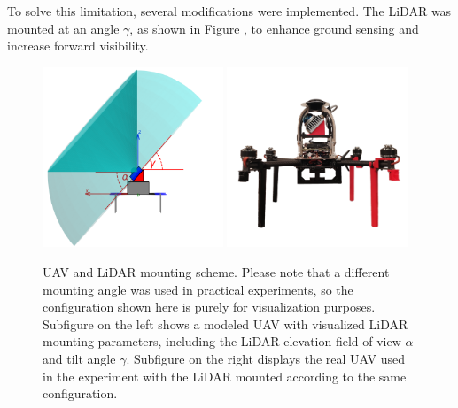             To solve this limitation, several modifications were implemented. 
            The \ac{LiDAR} was mounted at an angle $\gamma$, as shown in Figure , to enhance ground sensing and increase forward visibility.

            \begin{figure}[htbp]
                \centering
                \includegraphics[width=0.48\textwidth]{./fig/photos/uav_side_view.png}
                \includegraphics[width=0.48\textwidth]{./fig/photos/uav_photo.png}
                \caption{
                    \ac{UAV} and \ac{LiDAR} mounting scheme.
                    Please note that a different mounting angle was used in practical experiments, so the configuration shown here is purely for visualization purposes.
                    Subfigure on the left shows a modeled \ac{UAV} with visualized \ac{LiDAR} mounting parameters, including the \ac{LiDAR} elevation field of view $\alpha$ and tilt angle $\gamma$. 
                    Subfigure on the right displays the real \ac{UAV} used in the experiment with the \ac{LiDAR} mounted according to the same configuration.                                                
                }
                \label{fig:uavs}
            \end{figure}

